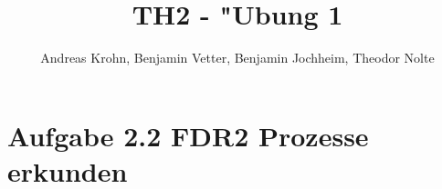 \documentclass{scrreprt}
\title{TH2 - "Ubung 1}
\author{Andreas Krohn, Benjamin Vetter, Benjamin Jochheim, Theodor Nolte}
\begin{document}
\maketitle

\chapter{Aufgabe 2.2 FDR2 Prozesse erkunden}

\end{document}
